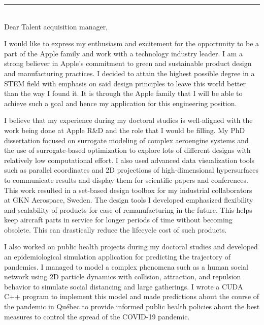 \documentclass[12pt]{article} %
\begin{document}
\begin{paracol}{2}
\end{paracol}

\medskip %
\rule[0pt]{\textwidth}{1pt}\\

Dear Talent acquisition manager,

\medskip %
I would like to express my enthusiasm and excitement for the opportunity to be a part of the Apple family and work with a technology industry leader. I am a strong believer in Apple's commitment to green and sustainable product design and manufacturing practices. I decided to attain the highest possible degree in a STEM field with emphasis on said design principles to leave this world better than the way I found it. It is through the Apple family that I will be able to achieve such a goal and hence my application for this engineering position.

\medskip %

I believe that my experience during my doctoral studies is well-aligned with the work being done at Apple R\&D and the role that I would be filling. My PhD dissertation focused on surrogate modeling of complex aeroengine systems and the use of surrogate-based optimization to explore lots of different designs with relatively low computational effort. I also used advanced data visualization tools such as parallel coordinates and 2D projections of high-dimensional hypersurfaces to communicate results and display them for scientific papers and conferences. This work resulted in a set-based design toolbox for my industrial collaborators at GKN Aerospace, Sweden. The design tools I developed emphasized flexibility and scalability of products for ease of remanufacturing in the future. This helps keep aircraft parts in service for longer periods of time without becoming obsolete. This can drastically reduce the lifecycle cost of such products.

\medskip %

I also worked on public health projects during my doctoral studies and developed an epidemiological simulation application for predicting the trajectory of pandemics. I managed to model a complex phenomena such as a human social network using 2D particle dynamics with collision, attraction, and repulsion behavior to simulate social distancing and large gatherings. I wrote a CUDA C++ program to implement this model and made predictions about the course of the pandemic in Qu{\'e}bec to provide informed public health policies about the best measures to control the spread of the COVID-19 pandemic.
\end{document}
